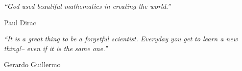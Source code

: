 

\pagestyle{empty} %

\null\vfill %

\textit{``God used beautiful mathematics in creating the world.''}

\begin{flushright}
Paul Dirac
\end{flushright}

\vfill\vfill\vfill\null %
\null\vfill %

\textit{``It is a great thing to be a forgetful scientist. Everyday you get to
  learn a new thing!-- even if it is the same one.''}

\begin{flushright}
  Gerardo Guillermo
\end{flushright}

\vfill\vfill\vfill\vfill  \vfill\null
\clearpage %
